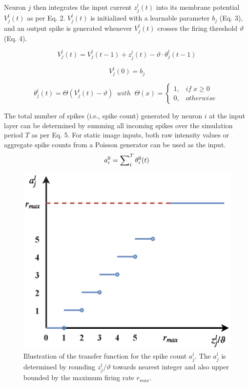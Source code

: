\documentclass[conference]{IEEEtran}
\begin{document}
Neuron $j$ then integrates the input current $z_j^l(t)$ into its membrane potential $V_j^l(t)$ as per Eq. 2. $V_j^l(t)$ is initialized with a learnable parameter ${b_j}$ (Eq. 3), and an output spike is generated whenever $V_j^l(t)$ crosses the firing threshold $\vartheta$ (Eq. 4).

\begin{equation}
V_j^l(t) = V_j^l(t - 1) + z_j^l(t) - \vartheta \cdot \theta _j^l(t - 1)
\end{equation}

\begin{equation}
V_j^l(0) =  {b_j}
\end{equation}

\begin{equation}
\theta _j^l(t) = \Theta (V_j^l(t) - \vartheta) \;\; with \;\; \Theta (x) = \left\{\begin{array}{l}1,\;\;\; if\;x \ge 0\\
0,\;\;\;otherwise\;
\end{array} \right.
\end{equation}

The total number of spikes (i.e., spike count) generated by neuron $i$ at the input layer can be determined by summing all incoming spikes over the simulation period $T$ as per Eq. 5. For static image inputs, both raw intensity values or aggregate spike counts from a Poisson generator can be used as the input.
\begin{equation}
a_i^0 = \sum\nolimits_t^T {\theta _i^0(t)} \\
\end{equation}

\begin{figure}[htb]	
	\begin{minipage}[b]{1.0\linewidth}
		\centering
		\centerline
		{\includegraphics[width = 8 cm]{activationFunc.eps}}
		\caption{Illustration of the transfer function for the spike count $a_j^l$. The $a_j^l$ is determined by rounding  ${z_j^l}\slash{\vartheta}$  towards nearest integer and also upper bounded by the maximum firing rate $r_{max}$.}
		\label{fig:activationFunc}
	\end{minipage}
\end{figure}
\end{document}
